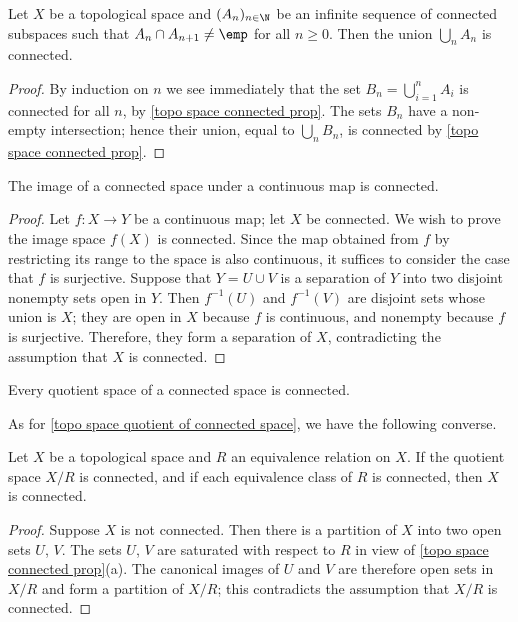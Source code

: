 \begin{corollary}
Let $X$ be a topological space and $(A_n)_{n\in\N}$ be an infinite sequence of connected subspaces such that $A_n\cap A_{n+1}\neq\emp$ for all $n\geq 0$. Then the union $\bigcup_nA_n$ is connected.
\end{corollary}
\begin{proof}
By induction on $n$ we see immediately that the set $B_n=\bigcup_{i=1}^{n}A_i$ is connected for all $n$, by \cref{topo space connected prop}. The sets $B_n$ have a non-empty intersection; hence their union, equal to $\bigcup_nB_n$, is connected by \cref{topo space connected prop}.
\end{proof}
\begin{proposition}\label{topo space connected continuous image}
The image of a connected space under a continuous map is connected.
\end{proposition}
\begin{proof}
Let $f:X\to Y$ be a continuous map; let $X$ be connected. We wish to prove the image space $f(X)$ is connected. Since the map obtained from $f$ by restricting its range to the space is also continuous, it suffices to consider the case that $f$ is surjective. Suppose that $Y=U\cup V$ is a separation of $Y$ into two disjoint nonempty sets open in $Y$. Then $f^{-1}(U)$ and $f^{-1}(V)$ are disjoint sets whose union is $X$; they are open in $X$ because $f$ is continuous, and nonempty because $f$ is surjective. Therefore, they form a separation of $X$, contradicting the assumption that $X$ is connected.
\end{proof}
\begin{corollary}\label{topo space quotient of connected space}
Every quotient space of a connected space is connected.
\end{corollary}
As for \cref{topo space quotient of connected space}, we have the following converse.
\begin{proposition}\label{topo space connected if quotient is}
Let $X$ be a topological space and $R$ an equivalence relation on $X$. If the quotient space $X/R$ is connected, and if each equivalence class of $R$ is connected, then $X$ is connected.
\end{proposition}
\begin{proof}
Suppose $X$ is not connected. Then there is a partition of $X$ into two open sets $U$, $V$. The sets $U$, $V$ are saturated with respect to $R$ in view of \cref{topo space connected prop}(a). The canonical images of $U$ and $V$ are therefore open sets in $X/R$ and form a partition of $X/R$; this contradicts the assumption that $X/R$ is connected.
\end{proof}
